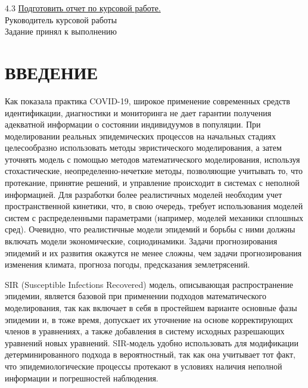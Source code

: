 \documentclass[a4paper, 12pt]{extarticle}
\numberwithin{equation}{section}
\begin{document}
	4.3 \underline{Подготовить отчет по курсовой работе.\hspace*{\linegoal}}\\[2mm]
	\vfill
	\noindent Руководитель курсовой работы \\[2mm]
	Задание принял к выполнению \hspace*{4mm} \\[2mm]
	\newpage
	\tableofcontents
	\newpage
	\section*{ВВЕДЕНИЕ}
	Как показала практика COVID-19, широкое применение современных средств идентификации, диагностики и мониторинга не дает гарантии получения адекватной информации о состоянии индивидуумов в популяции. При моделировании реальных эпидемических процессов на начальных стадиях целесообразно использовать методы эвристического моделирования, а затем уточнять модель с помощью методов математического моделирования, используя стохастические, неопределенно-нечеткие
	методы, позволяющие учитывать то, что протекание, принятие решений, и управление происходит в системах с неполной информацией.
	Для разработки более реалистичных моделей необходим учет пространственной кинетики, что, в свою очередь, требует использования моделей систем с распределенными параметрами (например, моделей механики сплошных сред). Очевидно, что реалистичные модели эпидемий и борьбы с ними должны включать модели экономические, социодинамики. Задачи прогнозирования эпидемий и их развития окажутся не менее сложны, чем задачи прогнозирования изменения климата, прогноза погоды, предсказания землетрясений.
	
	SIR (Susceptible Infections Recovered) модель, описывающая распространение эпидемии, является базовой при применении подходов математического моделирования, так как включает в себя в простейшем варианте основные фазы эпидемии и, в тоже время, допускает их уточнение на основе корректирующих членов в уравнениях, а также добавления в систему  исходных разрешающих уравнений новых уравнений. 
	SIR-модель удобно использовать для модификации детерминированного подхода в вероятностный, так как она учитывает тот факт, что эпидемиологические процессы протекают в условиях наличия неполной информации и погрешностей наблюдения.
	\newpage
\end{document}
